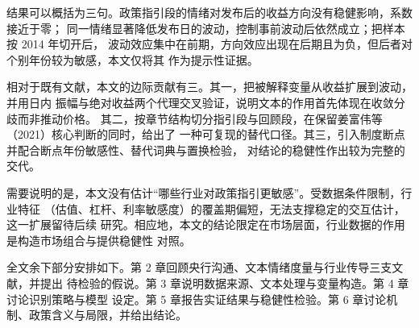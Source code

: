 结果可以概括为三句。政策指引段的情绪对发布后的收益方向没有稳健影响，系数接近于零；
同一情绪显著降低发布日的波动，控制事前波动后依然成立；把样本按 2014 年切开后，
波动效应集中在前期，方向效应出现在后期且为负，但后者对个别年份较为敏感，本文仅将其
作为提示性证据。

相对于既有文献，本文的边际贡献有三。其一，把被解释变量从收益扩展到波动，并用日内
振幅与绝对收益两个代理交叉验证，说明文本的作用首先体现在收敛分歧而非推动价格。
其二，按章节结构切分指引段与回顾段，在保留姜富伟等（2021）核心判断的同时，给出了
一种可复现的替代口径。其三，引入制度断点并配合断点年份敏感性、替代词典与置换检验，
对结论的稳健性作出较为完整的交代。

需要说明的是，本文没有估计“哪些行业对政策指引更敏感”。受数据条件限制，行业特征
（估值、杠杆、利率敏感度）的覆盖期偏短，无法支撑稳定的交互估计，这一扩展留待后续
研究。相应地，本文的结论限定在市场层面，行业数据的作用是构造市场组合与提供稳健性
对照。

全文余下部分安排如下。第 2 章回顾央行沟通、文本情绪度量与行业传导三支文献，并提出
待检验的假说。第 3 章说明数据来源、文本处理与变量构造。第 4 章讨论识别策略与模型
设定。第 5 章报告实证结果与稳健性检验。第 6 章讨论机制、政策含义与局限，并给出结论。
